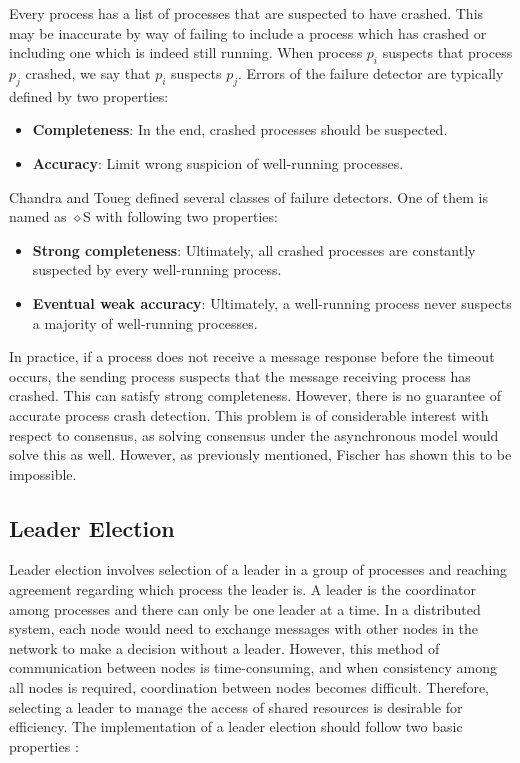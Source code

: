 \documentclass[12pt, a4paper]{article}
\begin{document}
Every process has a list of processes that are suspected to have crashed. This may be inaccurate by way of failing to include a process which has crashed or including one which is indeed still running. When process $p_{i}$ suspects that process $p_{j}$ crashed, we say that $p_{i}$ suspects $p_{j}$. Errors of the failure detector are typically defined by two properties:

\begin{itemize}
  \item \textbf{Completeness}: In the end, crashed processes should be suspected.
  \item \textbf{Accuracy}: Limit wrong suspicion of well-running processes.
\end{itemize}

Chandra and Toueg \cite{chandra1996unreliable} defined several classes of failure detectors. One of them is named as $\diamond$S with following two properties:

\begin{itemize}
  \item \textbf{Strong completeness}: Ultimately, all crashed processes are constantly suspected by every well-running process.
  \item \textbf{Eventual weak accuracy}: Ultimately, a well-running process never suspects a majority of well-running processes.
\end{itemize}

In practice, if a process does not receive a message response before the timeout occurs, the sending process suspects that the message receiving process has crashed. This can satisfy strong completeness. However, there is no guarantee of accurate process crash detection. This problem is of considerable interest with respect to consensus, as solving consensus under the asynchronous model would solve this as well. However, as previously mentioned, Fischer \cite{fischer1983consensus} has shown this to be impossible.

\subsection{Leader Election}
Leader election involves selection of a leader in a group of processes and reaching agreement regarding which process the leader is. A leader is the coordinator among processes and there can only be one leader at a time. In a distributed system, each node would need to exchange messages with other nodes in the network to make a decision without a leader. However, this method of communication between nodes is time-consuming, and when consistency among all nodes is required, coordination between nodes becomes difficult. Therefore, selecting a leader to manage the access of shared resources is desirable for efficiency. The implementation of a leader election should follow two basic properties \cite{nugraheni2009formal}:
\end{document}
